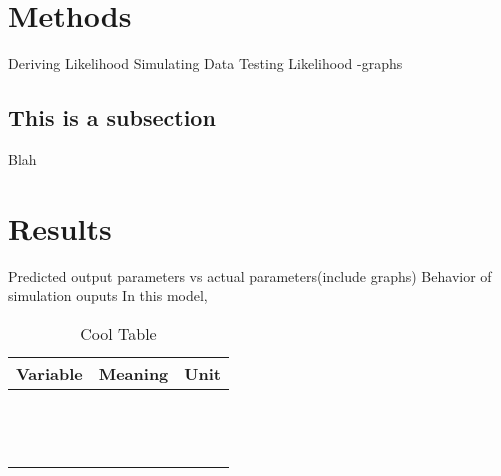 \documentclass{article}
\newcommand{\D}{\displaystyle}
\begin{document}
\section{Methods}
Deriving Likelihood\hfill\break
Simulating Data\hfill\break
Testing Likelihood\hfill\break
-graphs\hfill\break
\hfill\break
\subsection{This is a subsection}
Blah
\hfill\break

\hfill\break

\section{Results}
Predicted output parameters vs actual parameters(include graphs)\hfill\break
Behavior of simulation ouputs\hfill\break
\hfill\break
\hfill\break
In this model,
\hfill\break
\begin{table}
\caption{Cool Table} 
\centering 
\begin{tabular}{lll}
\hline
Variable  & Meaning &Unit\\ [0.5ex]
\hline
\\
&  &  $\D\frac{\mbox{}}{}$ \\ [0.5ex]	
&  &  $\D\frac{\mbox{}}{}$ \\ [0.5ex]
& &$\D\frac{\mbox{}}{}$ \\[0.5ex]
& &  $\D\frac{\mbox{}}{}$  \\ [0.5ex]

\hline
\end{tabular}
\label{table:variables} 
\end{table}
\hfill\break
\end{document}
